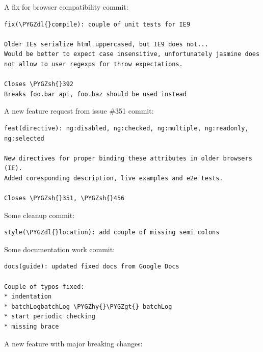\documentclass[letterpaper,10pt,english]{sphinxmanual}
\def\PYGZgt{\char`\>}
\def\PYGZsh{\char`\#}
\def\PYGZdl{\char`\$}
\def\PYGZhy{\char`\-}
\begin{document}
A fix for browser compatibility commit:

\begin{Verbatim}[commandchars=\\\{\}]
fix(\PYGZdl{}compile): couple of unit tests for IE9

Older IEs serialize html uppercased, but IE9 does not...
Would be better to expect case insensitive, unfortunately jasmine does
not allow to user regexps for throw expectations.

Closes \PYGZsh{}392
Breaks foo.bar api, foo.baz should be used instead
\end{Verbatim}

A new feature request from issue \#351 commit:

\begin{Verbatim}[commandchars=\\\{\}]
feat(directive): ng:disabled, ng:checked, ng:multiple, ng:readonly, ng:selected

New directives for proper binding these attributes in older browsers (IE).
Added coresponding description, live examples and e2e tests.

Closes \PYGZsh{}351, \PYGZsh{}456
\end{Verbatim}

Some cleanup commit:

\begin{Verbatim}[commandchars=\\\{\}]
style(\PYGZdl{}location): add couple of missing semi colons
\end{Verbatim}

Some documentation work commit:

\begin{Verbatim}[commandchars=\\\{\}]
docs(guide): updated fixed docs from Google Docs

Couple of typos fixed:
* indentation
* batchLogbatchLog \PYGZhy{}\PYGZgt{} batchLog
* start periodic checking
* missing brace
\end{Verbatim}

A new feature with major breaking changes:
\end{document}
